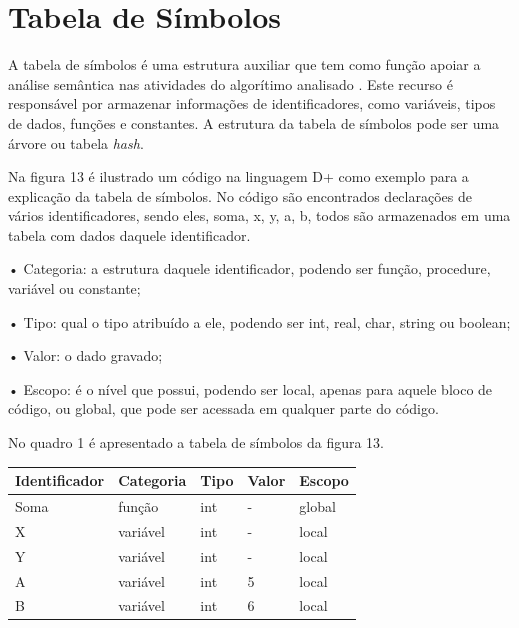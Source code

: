 \documentclass[12pt,oneside,a4paper,chapter=TITLE,section=TITLE,sumario=tradicional]{abntex2}
\begin{document}
\section{Tabela de Símbolos}
\label{sec:tabela-semantica}

A tabela de símbolos é uma estrutura auxiliar que tem como função apoiar a análise semântica nas atividades do algorítimo analisado \cite{ricarte2008}. Este recurso é responsável por armazenar informações de identificadores, como variáveis, tipos de dados, funções e constantes. A estrutura da tabela de símbolos pode ser uma árvore ou tabela \textit{hash}.

Na figura 13 é ilustrado um código na linguagem D+ como exemplo para a explicação da tabela de símbolos. No código são encontrados declarações de vários identificadores, sendo eles, soma, x, y, a, b, todos são armazenados em uma tabela com dados daquele identificador.

\begin{figure}[htb]
\end{figure}

•	Categoria: a estrutura daquele identificador, podendo ser função, procedure, variável ou constante;

•	Tipo: qual o tipo atribuído a ele, podendo ser int, real, char, string ou boolean;

•	Valor: o dado gravado;

•	Escopo: é o nível que possui, podendo ser local, apenas para aquele bloco de código, ou global, que pode ser acessada em qualquer parte do código.

No quadro 1 é apresentado a tabela de símbolos da figura 13.

\begin{quadro}[htb]
    \centering
    \vspace{0.5cm}
    \begin{tabular}{|p{3.0cm}|p{3.0cm}|p{3.0cm}|p{3.0cm}|p{3.0cm}|}
        \hline
        \textbf{Identificador} & \textbf{Categoria} & \textbf{Tipo} & \textbf{Valor} & \textbf{Escopo} \\ 
        \hline\hline
        Soma & função & int  &  -  & global   \\ \hline 
        X & variável  & int  & - & local  \\ \hline
        Y & variável  & int  &  -  & local  \\ \hline
        A & variável  & int  &  5  & local   \\ \hline
        B & variável  & int  & 6  & local   \\ \hline
    \end{tabular}

    
\end{quadro}
\end{document}
